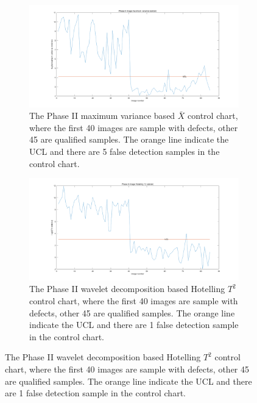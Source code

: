 \begin{figure}
    \centering
    \begin{subfigure}{\textwidth}
         \centering
         \includegraphics[width=\textwidth]{images/phaseII_max.png}
         \caption{The Phase II maximum variance based $\bar{X}$ control chart, where the first 40 images are sample with defects, other 45 are qualified samples. The orange line indicate the UCL and there are 5 false detection samples in the control chart.}
        \label{fig:max_result_15errors}
    \end{subfigure}
     
    \begin{subfigure}{\textwidth}
         \centering
         \includegraphics[width=\textwidth]{images/phaseII_t2.png}
         \caption{The Phase II wavelet decomposition based Hotelling $T^{2}$ control chart, where the first 40 images are sample with defects, other 45 are qualified samples. The orange line indicate the UCL and there are 1 false detection sample in the control chart.}
        \label{fig:T_result_d1}
    \end{subfigure}
\end{figure}



\newpage

